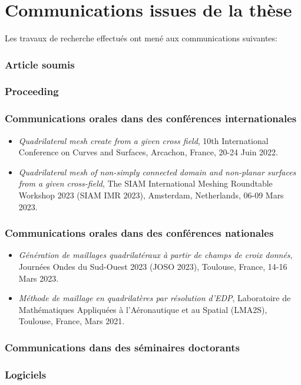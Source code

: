 \section{Communications issues de la thèse}

Les travaux de recherche effectués ont mené aux communications suivantes:

\subsubsection{Article soumis}

\subsubsection{Proceeding}

\subsubsection{Communications orales dans des conférences internationales}

\begin{itemize}
    \item \textit{Quadrilateral mesh create from a given cross field}, 10th International Conference on Curves and Surfaces, Arcachon, France, 20-24 Juin 2022.\\
    \item \textit{Quadrilateral mesh of non-simply connected domain and non-planar surfaces from a given cross-field}, The SIAM International Meshing Roundtable Workshop 2023 (SIAM IMR 2023), Amsterdam, Netherlands, 06-09 Mars 2023.
\end{itemize}

\subsubsection{Communications orales dans des conférences nationales}

\begin{itemize}
    \item \textit{Génération de maillages quadrilatéraux à partir de champs de croix donnés}, Journées Ondes du Sud-Ouest 2023 (JOSO 2023), Toulouse, France, 14-16 Mars 2023.\\
    \item \textit{Méthode de maillage en quadrilatères par résolution d'EDP}, Laboratoire de Mathématiques Appliquées à l'Aéronautique et au Spatial (LMA2S), Toulouse, France, Mars 2021.
\end{itemize}



\subsubsection{Communications dans des séminaires doctorants}


\subsubsection{Logiciels}


